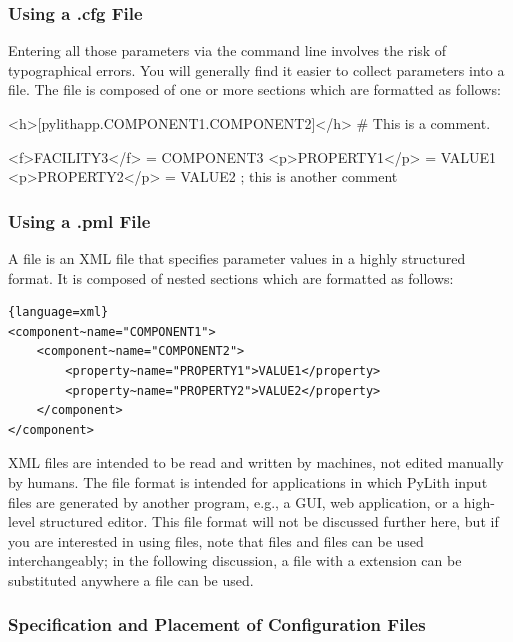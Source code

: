 \subsubsection{Using a {\ttfamily .cfg} File}

Entering all those parameters via the command line involves the risk
of typographical errors. You
will generally find it easier to collect parameters into a
 file. The file is composed of one or more sections
which are formatted as follows:
\begin{cfg}
<h>[pylithapp.COMPONENT1.COMPONENT2]</h>
# This is a comment.

<f>FACILITY3</f> = COMPONENT3
<p>PROPERTY1</p> = VALUE1
<p>PROPERTY2</p> = VALUE2 ; this is another comment
\end{cfg}



\subsubsection{Using a {\ttfamily.pml} File}

A  file is an XML file that specifies parameter values
in a highly structured format. It is composed of nested sections which
are formatted as follows:
\begin{lstlisting}[basicstyle=\ttfamily,frame=tb]{language=xml}
<component~name="COMPONENT1">
    <component~name="COMPONENT2">
        <property~name="PROPERTY1">VALUE1</property>
        <property~name="PROPERTY2">VALUE2</property>
    </component>
</component>
\end{lstlisting}
XML files are intended to be read and written by machines, not edited
manually by humans. The  file format is intended for
applications in which PyLith input files are generated by another
program, e.g., a GUI, web application, or a high-level structured
editor. This file format will not be discussed further here, but if
you are interested in using  files, note that 
files and  files can be used interchangeably; in the
following discussion, a file with a  extension can be
substituted anywhere a  file can be used.


\subsubsection{Specification and Placement of Configuration Files}

